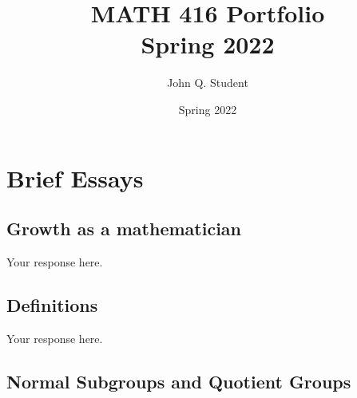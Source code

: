 \documentclass{scrbook}
\begin{document}
\title{MATH 416 Portfolio\\Spring 2022}
\author{John Q. Student}
\date{Spring 2022}
\maketitle
\tableofcontents
\chapter{Brief Essays}

\section{Growth as a mathematician}


Your response here.

\section{Definitions}


Your response here.

  \section{Normal Subgroups and Quotient Groups}

\end{document}
